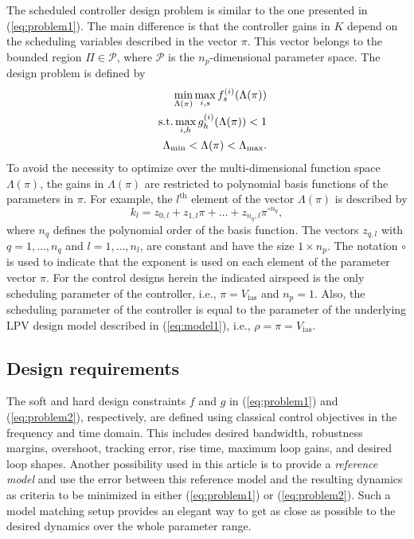 \documentclass[aerospace,article,submit,moreauthors,pdftex,10pt,a4paper]{Definitions/mdpi}
\begin{document}
The scheduled controller design problem \cite{Apkarian15} is similar to the one presented in (\ref{eq:problem1}). The main difference is that the controller gains in $K$ depend on the scheduling variables  described in the vector $\pi$. This vector belongs to the bounded region  $\Pi \in \mathcal{P}$, where $\mathcal{P}$ is the $n_p$-dimensional parameter space. The design problem is defined by
\begin{eqnarray}\label{eq:problem2}
&&\min_{\Lambda(\pi)} \max_{i,s} f_{s}^{(i)}(\Lambda(\pi)) \\
&&\textnormal{s.t.} \max_{i,h} g_{h}^{(i)}(\Lambda(\pi)) < 1 \nonumber \\
&& \Lambda_{\min} < \Lambda(\pi) < \Lambda_{\max}. \nonumber 
\end{eqnarray}
To avoid the necessity to optimize over the multi-dimensional function space $\Lambda(\pi)$, the gains in $\Lambda(\pi)$ are restricted to polynomial basis functions of the parameters in $\pi$. For example, the $l^{\text{th}}$ element of the vector $\Lambda(\pi)$ is described by
\begin{equation}\label{eq:basisf}
k_l = z_{0,l} + z_{1,l} \pi + \dots + z_{n_q,l} \pi^{\circ n_q},
\end{equation}
where $n_q$ defines the  polynomial order of the basis function. The vectors $z_{q,l}$ with $q = 1,\dots,n_q$ and $l = 1,\dots, n_l$, are constant and have the size $1 \times n_p$. The notation $\circ$ is used to indicate that the exponent is used on each element of the parameter vector $\pi$. For the control designs herein the indicated airspeed is the only  scheduling parameter of the controller, i.e., $\pi = V_{\text{ias}}$ and $n_p = 1$. Also, the scheduling parameter of the controller is equal to the  parameter of the underlying LPV design model described in (\ref{eq:model1}), i.e., $\rho = \pi = V_{\text{ias}}$. 


\subsection{Design requirements}
The soft and hard design constraints $f$ and $g$ in (\ref{eq:problem1}) and (\ref{eq:problem2}), respectively,  are defined using classical control objectives in the frequency and time domain. This includes desired bandwidth, robustness margins, overshoot, tracking error, rise time, maximum loop gains, and desired loop shapes.
Another possibility used in this article is to provide a \textit{reference model} and use the error between this reference model and the resulting dynamics as criteria to be minimized in either (\ref{eq:problem1}) or (\ref{eq:problem2}). Such a model matching setup provides an elegant way to get as close as possible to the desired dynamics over the whole parameter range.
\end{document}
